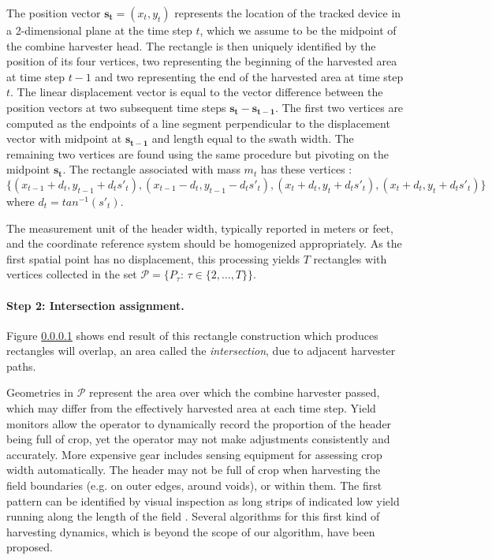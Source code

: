 The position vector $\mathbf{s_t} = (x_{t}, y_{t})$ represents the
location of the tracked device in a 2-dimensional plane at the time
step $t$, which we assume to be the midpoint of the combine harvester
head. The rectangle is then uniquely identified by the position of its
four vertices, two representing the beginning of the harvested area at
time step $t-1$ and two representing the end of the harvested area at
time step $t$. The linear displacement vector is equal to the vector
difference between the position vectors at two subsequent time steps
$\mathbf{s_t} - \mathbf{s_{t-1}}$. The first two vertices are computed
as the endpoints of a line segment perpendicular to the displacement
vector with midpoint at $\mathbf{s_{t-1}}$ and length equal to the
swath width. The remaining two vertices are found using the same
procedure but pivoting on the midpoint $\mathbf{s_t}$. The rectangle
associated with mass $m_t$ has these vertices :
$\{(x_{t-1} + d_t, y_{t-1} + d_ts'_t),(x_{t-1} - d_t, y_{t-1} -
d_ts'_t), (x_{t } + d_t, y_{t } + d_ts'_t),(x_{t } + d_t, y_{t } +
d_ts'_t)\}$ where $d_t = tan^{-1}(s'_t)$.

The measurement unit of the header width, typically reported in meters
or feet, and the coordinate reference system should be homogenized
appropriately. As the first spatial point has no displacement, this
processing yields $T$ rectangles with vertices collected in the set
$\mathcal{P} = \{P_{\tau}$: $\tau \in \{2, \dots, T\}\}$.

\paragraph{Step 2: Intersection assignment.}  Figure \ref{} shows end
result of this rectangle construction which produces rectangles will
overlap, an area called the \emph{intersection}, due to adjacent
harvester paths.

 Geometries in $\mathcal{P}$ represent the
area over which the combine harvester passed, which may differ from
the effectively harvested area at each time step. Yield monitors allow
the operator to dynamically record the proportion of the header being
full of crop, yet the operator may not make adjustments consistently
and accurately. More expensive gear includes sensing equipment for
assessing crop width automatically. The header may not be full of crop
when harvesting the field boundaries (e.g. on outer edges, around
voids), or within them. The first pattern can be identified by visual
inspection as long strips of indicated low yield running along the
length of the field \cite{Blackmore1999}. Several algorithms for this
first kind of harvesting dynamics, which is beyond the scope of our
algorithm, have been proposed.

